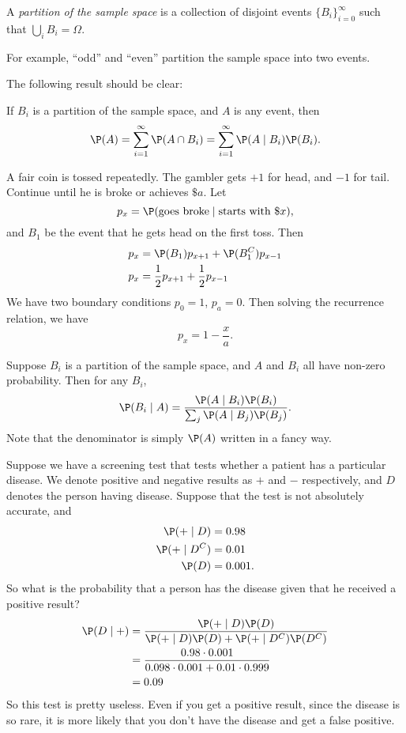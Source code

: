 \documentclass[a4paper]{article}
\begin{document}
\begin{defi}[Partition]
  A \emph{partition of the sample space} is a collection of disjoint events $\{B_i\}_{i = 0}^\infty$ such that $\bigcup_i B_i = \Omega$.
\end{defi}
For example, ``odd'' and ``even'' partition the sample space into two events.

The following result should be clear:
\begin{prop}
  If $B_i$ is a partition of the sample space, and $A$ is any event, then
  \[
    \P(A) = \sum_{i = 1}^\infty \P(A\cap B_i) = \sum_{i = 1}^\infty \P(A\mid B_i) \P(B_i).
  \]
\end{prop}

\begin{eg}
  A fair coin is tossed repeatedly. The gambler gets $+1$ for head, and $-1$ for tail. Continue until he is broke or achieves $\$a$. Let
  \[
    p_x = \P(\text{goes broke}\mid \text{starts with \$}x),
  \]
  and $B_1$ be the event that he gets head on the first toss. Then
  \begin{align*}
    p_x &= \P(B_1)p_{x + 1} + \P(B_1^C) p_{x - 1}\\
    p_x &= \frac{1}{2}p_{x + 1} + \frac{1}{2}p_{x - 1}
  \end{align*}
  We have two boundary conditions $p_0 = 1$, $p_a = 0$. Then solving the recurrence relation, we have
  \[
    p_x = 1 - \frac{x}{a}.
  \]
\end{eg}

\begin{thm}
  Suppose $B_i$ is a partition of the sample space, and $A$ and $B_i$ all have non-zero probability. Then for any $B_i$,
  \[
    \P(B_i \mid A) = \frac{\P(A \mid B_i)\P(B_i)}{\sum_j\P(A \mid B_j)\P(B_j)}.
  \]
  Note that the denominator is simply $\P(A)$ written in a fancy way.
\end{thm}

\begin{eg}
  Suppose we have a screening test that tests whether a patient has a particular disease. We denote positive and negative results as $+$ and $-$ respectively, and $D$ denotes the person having disease. Suppose that the test is not absolutely accurate, and
  \begin{align*}
    \P(+ \mid D) &= 0.98\\
    \P(+ \mid D^C) &= 0.01\\
    \P(D) &= 0.001.
  \end{align*}
  So what is the probability that a person has the disease given that he received a positive result?
  \begin{align*}
    \P(D\mid +) &= \frac{\P(+ \mid D)\P(D)}{\P(+\mid D)\P(D) + \P(+\mid D^C)\P(D^C)}\\
    &= \frac{0.98\cdot 0.001}{0.098\cdot 0.001 + 0.01\cdot 0.999}\\
    &= 0.09
  \end{align*}
  So this test is pretty useless. Even if you get a positive result, since the disease is so rare, it is more likely that you don't have the disease and get a false positive.
\end{eg}
\end{document}
